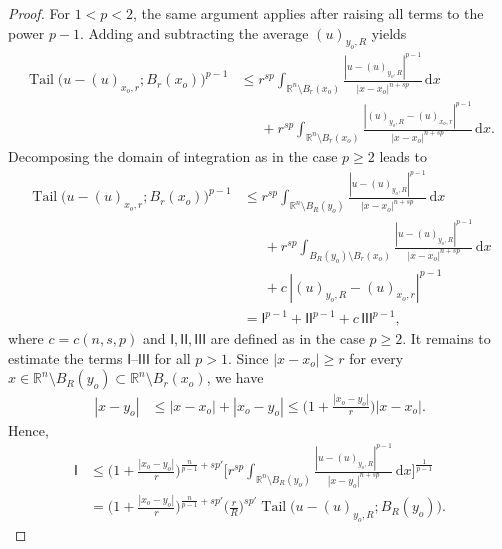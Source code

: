 \documentclass[10pt,letterpaper]{amsart}
\theoremstyle{definition}
\numberwithin{theorem}{section}
\numberwithin{equation}{section}
\newcommand{\1}{\ensuremath{\mathds{1}}}
\newcommand\sfI{{\boldsymbol{\mathsf I}}}
\DeclareMathOperator{\Tail}{Tail}
\numberwithin{equation}{section}
\begin{document}
\begin{proof}
For $1<p<2$, the same argument applies after raising all terms to the power $p-1$.
Adding and subtracting the average $(u)_{y_o,R}$ yields
\begin{align*}
    \Tail\big(u-(u)_{x_o,r}; B_r(x_o)\big)^{p-1}
    &\le 
    r^{sp}
    \int_{\mathbb{R}^n\setminus B_r(x_o)}
        \frac{|u-(u)_{y_o,R}|^{p-1}}{|x-x_o|^{n+sp}}\,\mathrm dx  \\
    &\phantom{\le\,} +
    r^{sp}
    \int_{\mathbb{R}^n\setminus B_r(x_o)}
        \frac{|(u)_{y_o,R}-(u)_{x_o,r}|^{p-1}}{|x-x_o|^{n+sp}}\,\mathrm dx .
\end{align*}
Decomposing the domain of integration as in the case $p\ge 2$ leads to
\begin{align*}
    \Tail\big(u-(u)_{x_o,r}; B_r(x_o)\big)^{p-1}
    &\le 
    r^{sp}
    \int_{\mathbb{R}^n\setminus B_R(y_o)}
        \frac{|u-(u)_{y_o,R}|^{p-1}}{|x-x_o|^{n+sp}}\,\mathrm dx \\
    &\phantom{\le\,} +
    r^{sp}
    \int_{B_R(y_o)\setminus B_r(x_o)}
        \frac{|u-(u)_{y_o,R}|^{p-1}}{|x-x_o|^{n+sp}}\,\mathrm dx  \\
    &\phantom{\le\,} +
    c\, |(u)_{y_o,R}-(u)_{x_o,r}|^{p-1} \\
    &=
    \sfI^{p-1} + \sfI\sfI^{p-1} + c\,\sfI\sfI\sfI^{p-1},
\end{align*}
where $c=c(n,s,p)$ and $\sfI,\sfI\sfI,\sfI\sfI\sfI$ are defined as in the case $p\ge 2$.
It remains to estimate the terms $\sfI$--$\sfI\sfI\sfI$ for all $p>1$. 
Since $|x-x_o|\ge r$ for every $x\in \mathbb{R}^n\setminus B_R(y_o) \subset \mathbb{R}^n\setminus B_r(x_o)$, 
we have
\begin{align*}
    |x-y_o|
    &\le 
    |x-x_o| + |x_o-y_o|
    \le 
    \bigg(1 + \frac{|x_o-y_o|}{r}\bigg) |x-x_o|.
\end{align*}
Hence,
\begin{align*}
    \sfI
    &\le 
    \bigg(1 + \frac{|x_o-y_o|}{r}\bigg)^{\frac{n}{p-1}+s p'}
    \bigg[r^{sp}
    \int_{\mathbb{R}^n\setminus B_R(y_o)}
        \frac{|u-(u)_{y_o,R}|^{p-1}}{|x-y_o|^{n+sp}}\,\mathrm dx
    \bigg]^{\frac{1}{p-1}} \\
    &=
    \bigg(1 + \frac{|x_o-y_o|}{r}\bigg)^{\frac{n}{p-1}+s p'}
    \bigg(\frac{r}{R}\bigg)^{s p'}
    \Tail\big(u-(u)_{y_o,R}; B_R(y_o)\big).
\end{align*}

\end{proof}
\end{document}
